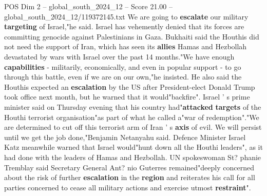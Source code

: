 \begin{textsample}{POS Dim 2 – global\_south\_2024\_12 – Score 21.00 – global\_south\_2024\_12/119372145.txt}
We are going to \textbf{escalate} our military \textbf{targeting} of Israel,"he said.
Israel has vehemently denied that its forces are committing genocide against Palestinians in Gaza.
Bukhaiti said the Houthis did not need the support of Iran, which has seen its \textbf{allies} Hamas and Hezbollah devastated by wars with Israel over the past 14 months."We have enough \textbf{capabilities} - militarily, economically, and even in popular support - to go through this battle, even if we are on our own,"he insisted.
He also said the Houthis expected an \textbf{escalation} by the US after President-elect Donald Trump took office next month, but he warned that it would"backfire".
Israel ' s prime minister said on Thursday evening that his country had"\textbf{attacked} \textbf{targets} of the Houthi terrorist organisation"as part of what he called a"war of redemption"."We are determined to cut off this terrorist arm of Iran ' s \textbf{axis} of evil.
We will persist until we get the job done,"Benjamin Netanyahu said.
Defence Minister Israel Katz meanwhile warned that Israel would"hunt down all the Houthi leaders", as it had done with the leaders of Hamas and Hezbollah.
UN spokeswoman St? phanie Tremblay said Secretary General Ant? nio Guterres remained"deeply concerned about the risk of further \textbf{escalation} in the \textbf{region} and reiterates his call for all parties concerned to cease all military actions and exercise utmost \textbf{restraint}".

\end{textsample}
